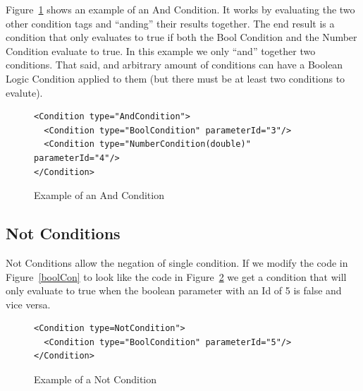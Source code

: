 Figure~\ref{andCon} shows an example of an And Condition. It works by evaluating the two other condition tags and ``anding'' their results together. The end result is a
condition that only evaluates to true if both the Bool Condition and the Number Condition evaluate to true. In this example we only ``and'' together two conditions. That said,
and arbitrary amount of conditions can have a Boolean Logic Condition applied to them (but there must be at least two conditions to evalute).
\begin{figure}
\centering
{\footnotesize
\begin{verbatim}
<Condition type="AndCondition">
  <Condition type="BoolCondition" parameterId="3"/>
  <Condition type="NumberCondition(double)" parameterId="4"/>
</Condition>
\end{verbatim}
}
\caption{Example of an And Condition}
\label{andCon}
\end{figure}

\subsection{Not Conditions}
Not Conditions allow the negation of single condition. If we modify the code in Figure~\ref{boolCon} to look like the code in Figure~\ref{notCon} we get a 
condition that will only evaluate to true when the boolean parameter with an Id of 5 is false and vice versa. 
\begin{figure}
\centering
{\footnotesize
\begin{verbatim}
<Condition type=NotCondition">
  <Condition type="BoolCondition" parameterId="5"/>
</Condition>
\end{verbatim}
}
\caption{Example of a Not Condition}
\label{notCon}
\end{figure}


